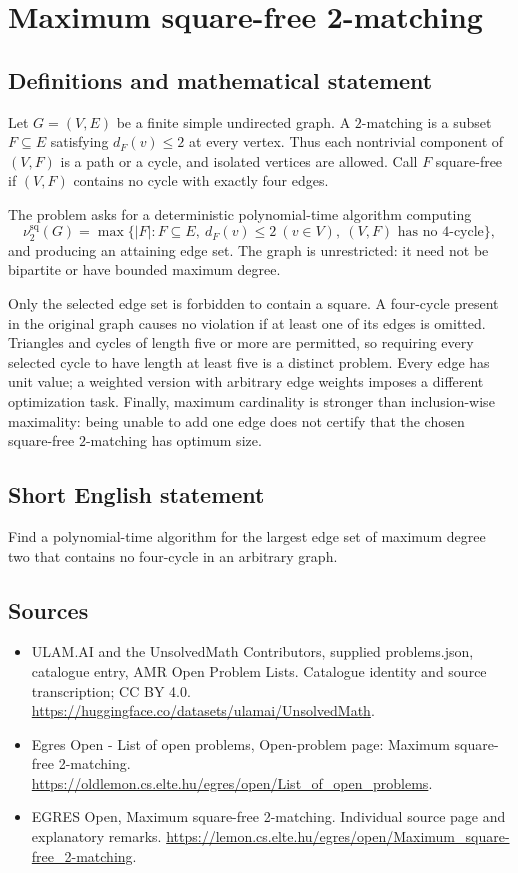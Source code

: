 \documentclass[11pt,a4paper]{article}
\begin{document}
\section*{Maximum square-free 2-matching}\label{statement}

\subsection{Definitions and mathematical statement}
Let $G=(V,E)$ be a finite simple undirected graph. A $2$-matching is
a subset $F\subseteq E$ satisfying $d_F(v)\le2$ at every vertex.
Thus each nontrivial component of $(V,F)$ is a path or a cycle,
and isolated vertices are allowed. Call $F$ square-free if $(V,F)$
contains no cycle with exactly four edges.

The problem asks for a deterministic polynomial-time algorithm
computing
\[
             \nu^{\mathrm{sq}}_2(G)=
             \max\{|F|:F\subseteq E,\ d_F(v)\le2\ (v\in V),
                                  \ (V,F)\text{ has no }4\text{-cycle}\},
\]
and producing an attaining edge set.
The graph is unrestricted: it need not be bipartite or have bounded
maximum degree.

Only the selected edge set is forbidden to contain a square. A
four-cycle present in the original graph causes no violation if at
least one of its edges is omitted. Triangles and cycles of length
five or more are permitted, so requiring every selected cycle to
have length at least five is a distinct problem. Every edge has unit
value; a weighted version with arbitrary edge weights imposes a
different optimization task. Finally, maximum cardinality is stronger
than inclusion-wise maximality: being unable to add one edge does not
certify that the chosen square-free $2$-matching has optimum size.
\subsection{Short English statement}
Find a polynomial-time algorithm for the largest edge set of
maximum degree two that contains no four-cycle in an arbitrary graph.
\subsection{Sources}
\begin{itemize}
\item[S1] ULAM.AI and the UnsolvedMath Contributors, supplied problems.json, catalogue entry, AMR Open Problem Lists. Catalogue identity and source transcription; CC BY 4.0.
\url{https://huggingface.co/datasets/ulamai/UnsolvedMath}.
\item[S2] Egres Open - List of open problems, Open-problem page: Maximum square-free 2-matching. 
\url{https://oldlemon.cs.elte.hu/egres/open/List_of_open_problems}.
\item[S3] EGRES Open, Maximum square-free 2-matching. Individual source page and explanatory remarks.
\url{https://lemon.cs.elte.hu/egres/open/Maximum_square-free_2-matching}.
\end{itemize}
\end{document}
